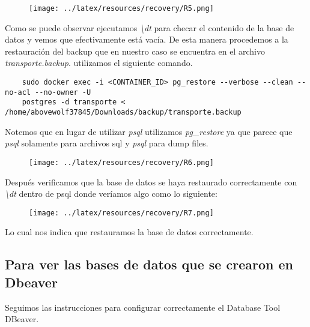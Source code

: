 \begin{figure}[h!]
    \centering
        \texttt{[image: ../latex/resources/recovery/R5.png]}
\end{figure}

Como se puede observar ejecutamos \textit{\textbackslash dt} para checar el contenido de la base de datos y vemos que efectivamente está vacía. De esta manera procedemos a la restauración del backup que en nuestro caso se encuentra en el archivo \textit{transporte.backup}. utilizamos el siguiente comando. \\

\begin{verbatim}
    sudo docker exec -i <CONTAINER_ID> pg_restore --verbose --clean --no-acl --no-owner -U 
    postgres -d transporte < /home/abovewolf37845/Downloads/backup/transporte.backup
\end{verbatim}

Notemos que en lugar de utilizar \textit{psql} utilizamos \textit{pg\_restore} ya que parece que \textit{psql} solamente para archivos sql y \textit{psql} para dump files. \\

\begin{figure}[h!]
    \centering
        \texttt{[image: ../latex/resources/recovery/R6.png]}
\end{figure}

\newpage

Después verificamos que la base de datos se haya restaurado correctamente con \textit{\textbackslash dt} dentro de psql donde veríamos algo como lo siguiente: \\ 

\begin{figure}[h!]
    \centering
        \texttt{[image: ../latex/resources/recovery/R7.png]}
\end{figure}

Lo cual nos indica que restauramos la base de datos correctamente. \\

\subsection*{Para ver las bases de datos que se crearon en Dbeaver}

Seguimos las instrucciones para configurar correctamente el Database Tool DBeaver. \\

